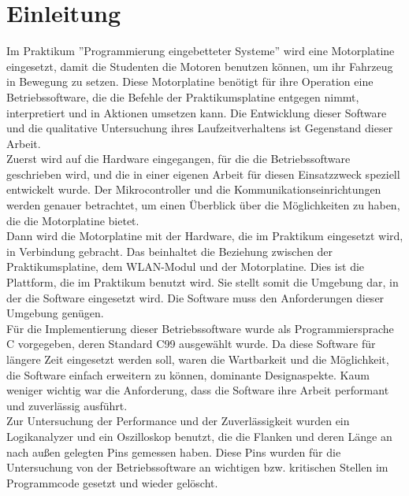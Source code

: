 \chapter{Einleitung}

Im Praktikum ''Programmierung eingebetteter Systeme'' wird eine Motorplatine \cite{STUD_TIMO}
eingesetzt, damit die Studenten die Motoren benutzen können, um ihr Fahrzeug
in Bewegung zu setzen. Diese Motorplatine benötigt für ihre Operation eine
Betriebssoftware, die die Befehle der Praktikumsplatine entgegen nimmt,
interpretiert und in Aktionen umsetzen kann. Die Entwicklung dieser Software
und die qualitative Untersuchung ihres Laufzeitverhaltens ist Gegenstand
dieser Arbeit.\\
Zuerst wird auf die Hardware eingegangen, für die die Betriebssoftware geschrieben wird,
und die in einer eigenen Arbeit für diesen Einsatzzweck speziell entwickelt wurde.
Der Mikrocontroller und die Kommunikationseinrichtungen werden genauer betrachtet, um
einen Überblick über die Möglichkeiten zu haben, die die Motorplatine bietet.\\
Dann wird die Motorplatine mit der Hardware, die im Praktikum eingesetzt wird, in Verbindung
gebracht. Das beinhaltet die Beziehung zwischen der Praktikumsplatine, dem WLAN-Modul und der
Motorplatine. Dies ist die Plattform, die im Praktikum benutzt wird. Sie stellt somit die
Umgebung dar, in der die Software eingesetzt wird. Die Software muss den Anforderungen
dieser Umgebung genügen.\\
Für die Implementierung dieser Betriebssoftware wurde als Programmiersprache
C \cite{C_PROG} vorgegeben, deren Standard C99 ausgewählt wurde. Da diese
Software für längere Zeit eingesetzt werden soll, waren die
Wartbarkeit und die Möglichkeit, die Software einfach erweitern zu können,
dominante Designaspekte. Kaum weniger wichtig war die Anforderung, dass die Software
ihre Arbeit performant und zuverlässig ausführt.\\
Zur Untersuchung der Performance und der Zuverlässigkeit wurden ein Logikanalyzer und ein
Oszilloskop benutzt, die die Flanken und deren Länge
an nach außen gelegten Pins gemessen haben. Diese Pins wurden für die Untersuchung von der
Betriebssoftware an wichtigen bzw. kritischen Stellen im Programmcode gesetzt und wieder gelöscht.
